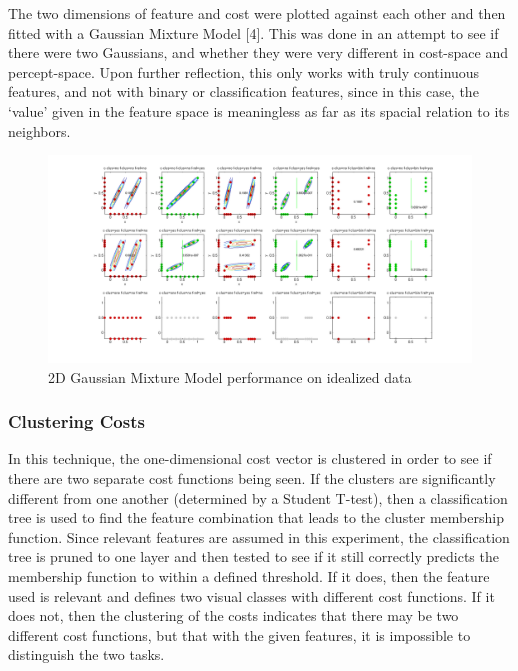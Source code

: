 \documentclass[12pt]{article}
\begin{document}
The two dimensions of feature and cost were plotted against each other and then fitted with a Gaussian Mixture Model [4]. This was done in an attempt to see if there were two Gaussians, and whether they were very different in cost-space and percept-space. Upon further reflection, this only works with truly continuous features, and not with binary or classification features, since in this case, the `value' given in the feature space is meaningless as far as its spacial relation to its neighbors.

\begin{figure}[ht]
  \centerline{
  \includegraphics[width=1.5\columnwidth]{2d_gaussians.png}}
  \caption{\label{fig_2d_gaussians} 2D Gaussian Mixture Model performance on idealized data}
  \label{fig:2Dgaussians}
\end{figure}


\subsubsection{Clustering Costs}

In this technique, the one-dimensional cost vector is clustered in order to see if there are two separate cost functions being seen. If the clusters are significantly different from one another (determined by a Student T-test), then a classification tree is used to find the feature combination that leads to the cluster membership function. Since relevant features are assumed in this experiment, the classification tree is pruned to one layer and then tested to see if it still correctly predicts the membership function to within a defined threshold. If it does, then the feature used is relevant and defines two visual classes with different cost functions. If it does not, then the clustering of the costs indicates that there may be two different cost functions, but that with the given features, it is impossible to distinguish the two tasks. 
\end{document}
